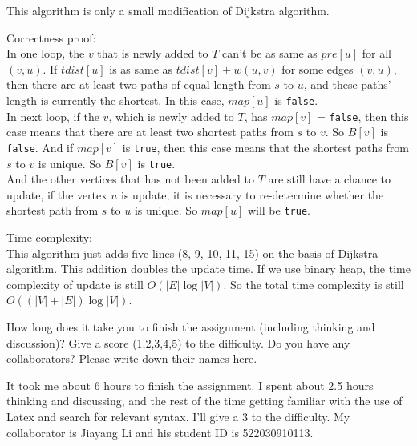 \documentclass{oxmathproblems}
\begin{document}
\begin{questions}
This algorithm is only a small modification of Dijkstra algorithm.
\begin{breakablealgorithm}
\caption{$is\_unique(s, G)$}
\begin{algorithmic}[1]
\ENDIF
{}
\ENDIF
\ENDWHILE
\end{algorithmic}
\end{breakablealgorithm}
Correctness proof:\\
In one loop, the $v$ that is newly added to $T$ can't be as same as $pre[u]$ for all $(v, u)$. If $tdist[u]$ is as same as $tdist[v]+w(u, v)$ for some edges $(v, u)$, then there are at least two paths of equal length from $s$ to $u$, and these paths' length is currently the shortest. In this case, $map[u]$ is \texttt{false}.\\
In next loop, if the $v$, which is newly added to $T$, has $map[v]$ = \texttt{false}, then this case means that there are at least two shortest paths from $s$ to $v$. So $B[v]$ is \texttt{false}. And if $map[v]$ is \texttt{true}, then this case means that the shortest paths from $s$ to $v$ is unique. So $B[v]$ is \texttt{true}.\\
And the other vertices that has not been added to $T$ are still have a chance to update, if the vertex $u$ is update, it is necessary to re-determine whether the shortest path from $s$ to $u$ is unique. So $map[u]$ will be \texttt{true}.

Time complexity:\\
This algorithm just adds five lines (8, 9, 10, 11, 15) on the basis of Dijkstra algorithm. This addition doubles the update time. If we use binary heap, the time complexity of update is still $O(|E|\log{|V|})$. So the total time complexity is still $O((|V|+|E|)\log{|V|})$.

\miquestion
How long does it take you to finish the assignment (including thinking and discussion)?
Give a score (1,2,3,4,5) to the difficulty.
Do you have any collaborators?
Please write down their names here.

It took me about 6 hours to finish the assignment. I spent about 2.5 hours thinking and discussing, and the rest of the time getting familiar with the use of Latex and search for relevant syntax.
I'll give a 3 to the difficulty. My collaborator is Jiayang Li and his student ID is 522030910113.

\end{questions}
\end{document}
